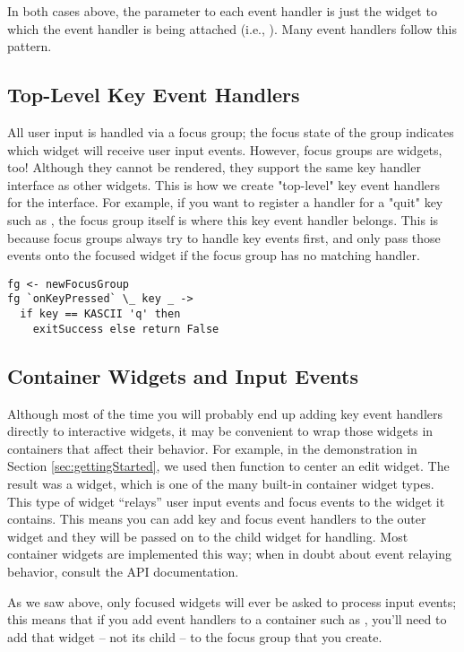 In both cases above, the  parameter to each event handler is
just the widget to which the event handler is being attached (i.e.,
).  Many event handlers follow this pattern.

\subsection{Top-Level Key Event Handlers}

All user input is handled via a focus group; the focus state of the
group indicates which widget will receive user input events.  However,
focus groups are widgets, too!  Although they cannot be rendered, they
support the same key handler interface as other widgets.  This is how
we create "top-level" key event handlers for the interface.  For
example, if you want to register a handler for a "quit" key such as
, the focus group itself is where this key event handler
belongs.  This is because focus groups always try to handle key events
first, and only pass those events onto the focused widget if the focus
group has no matching handler.

\begin{verbatim}
fg <- newFocusGroup
fg `onKeyPressed` \_ key _ ->
  if key == KASCII 'q' then
    exitSuccess else return False
\end{verbatim}

\subsection{Container Widgets and Input Events}

Although most of the time you will probably end up adding key event
handlers directly to interactive widgets, it may be convenient to wrap
those widgets in containers that affect their behavior.  For example,
in the demonstration in Section \ref{sec:gettingStarted}, we used then
 function to center an edit widget.  The result was a
 widget, which is one of the many built-in container
widget types.  This type of widget ``relays'' user input events and
focus events to the widget it contains.  This means you can add key
and focus event handlers to the outer widget and they will be passed
on to the child widget for handling.  Most container widgets are
implemented this way; when in doubt about event relaying behavior,
consult the API documentation.

As we saw above, only focused widgets will ever be asked to process
input events; this means that if you add event handlers to a container
such as , you'll need to add that widget -- not its child
-- to the focus group that you create.

